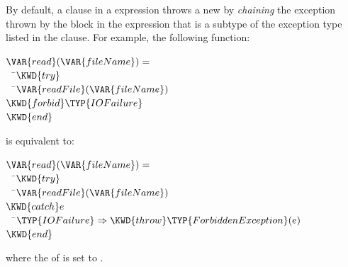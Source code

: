 By default, a  clause in a  expression
throws a new  by \emph{chaining}
the exception thrown by the  block in the 
expression that is a subtype of the exception type listed in the
 clause.
For example, the following  function:
\begin{Fortress}
\(\VAR{read}(\VAR{fileName}) = \)\\
{\tt~~}\pushtabs\=\+\(  \KWD{try}\)\\
{\tt~~}\pushtabs\=\+\(    \VAR{readFile}(\VAR{fileName})\)\-\\\poptabs
\(  \KWD{forbid} \TYP{IOFailure}\)\\
\(  \KWD{end}\)\-\\\poptabs
\end{Fortress}
is equivalent to:
\begin{Fortress}
\(\VAR{read}(\VAR{fileName}) = \)\\
{\tt~~}\pushtabs\=\+\(  \KWD{try}\)\\
{\tt~~}\pushtabs\=\+\(    \VAR{readFile}(\VAR{fileName})\)\-\\\poptabs
\(  \KWD{catch} e\)\\
{\tt~~}\pushtabs\=\+\(    \TYP{IOFailure} \Rightarrow \KWD{throw} \TYP{ForbiddenException}(e)\)\-\\\poptabs
\(  \KWD{end}\)\-\\\poptabs
\end{Fortress}
where the  of  is set to .
